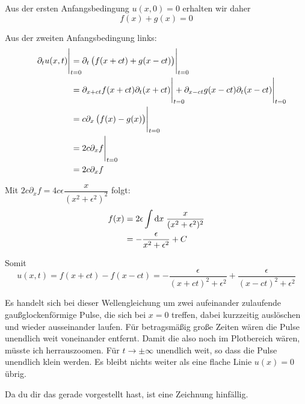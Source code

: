 \documentclass[a4paper,german,12pt,smallheadings]{scrartcl}
\begin{document}
Aus der ersten Anfangsbedingung $u(x,0) = 0$ erhalten wir daher
\begin{equation}
  f(x) + g(x) = 0
\end{equation}

Aus der zweiten Anfangsbedingung links:
\begin{align}
 \eval{\partial_t u(x,t)}_{\mathrlap{t=0}} 
 &= \eval{\partial_t \del{f(x+ct) + g(x-ct)}}_{t=0} \\
 &= \eval{\partial_{x+ct} f(x+ct) \partial_{t} (x+ct)}_{\mathrlap{t=0}} +
    \eval{\partial_{x-ct} g(x-ct) \partial_{t} (x-ct)}_{\mathrlap{t=0}} \\
 &= \eval{c \partial_x \del{f(x) - g(x)}}_{t=0} \\
 &= \eval{2c \partial_x f}_{t=0} \\
 &= 2c \partial_x f
\end{align}

Mit $2c \partial_x f = 4c \epsilon \dfrac{x}{(x^2+\epsilon^2)^2}$ folgt:
\begin{align}
  f(x)
  &= 2 \epsilon \int \dif x \; \frac{x}{(x^2+\epsilon^2)^2} \\
  &= -\frac{\epsilon}{x^2 + \epsilon^2} + C
\end{align}

Somit
\begin{equation}
  u(x,t) = f(x+ct) - f(x-ct) = -\frac{\epsilon}{(x+ct)^2 + \epsilon^2} + \frac{\epsilon}{(x-ct)^2 + \epsilon^2}
\end{equation}

Es handelt sich bei dieser Wellengleichung um zwei aufeinander zulaufende
gaußglockenförmige Pulse, die sich bei $x=0$ treffen, dabei kurzzeitig
auslöschen und wieder ausseinander laufen. Für betragsmäßig große Zeiten wären
die Pulse unendlich weit voneinander entfernt. Damit die also noch im
Plotbereich wären, müsste ich herrauszoomen. Für $t \to \pm \infty$ unendlich
weit, so dass die Pulse unendlich klein werden. Es bleibt nichts weiter als
eine flache Linie $u(x) = 0$ übrig.

Da du dir das gerade vorgestellt hast, ist eine Zeichnung hinfällig.
\end{document}
